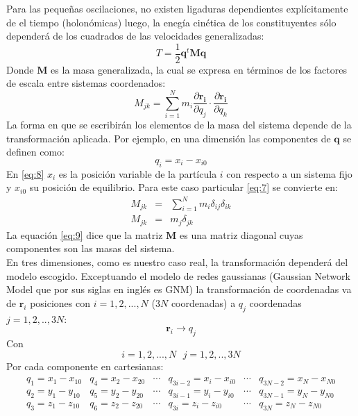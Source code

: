 Para las peque\~{n}as oscilaciones, no existen ligaduras dependientes expl\'{i}citamente de el tiempo (holon\'{o}micas) luego, la eneg\'{i}a cin\'{e}tica de los constituyentes s\'{o}lo depender\'{a} de los cuadrados de las velocidades generalizadas:
\begin{equation}
T=\frac{1}{2}\mathbf{q}^t\mathbf{M}\mathbf{q}
\end{equation}\label{eq:6}
Donde $\mathbf{M}$ es la masa generalizada, la cual se expresa en t\'{e}rminos de los factores de escala entre sistemas coordenados:
\begin{equation}
M_{jk}=\sum_{i=1}^{N} m_{i}\frac{\partial \mathbf{r_{i}} }{\partial q_j}\cdot\frac{\partial \mathbf{r_{i}} }{\partial q_k}
\end{equation}\label{eq:7}
La forma en que se escribir\'{a}n los elementos de la masa del sistema depende de la transformaci\'{o}n aplicada. Por ejemplo, en una dimensi\'{o}n las componentes de $\mathbf{q}$ se definen como:
\begin{equation}
q_i=x_i-x_{i0}
\end{equation}\label{eq:8}
En \eqref{eq:8} $x_i$ es la posici\'{o}n variable de la part\'{i}cula $i$ con respecto a un sistema fijo y $x_{i0}$ su posici\'{o}n de equilibrio. Para este caso particular \eqref{eq:7} se convierte en:
\begin{eqnarray}
M_{jk}&=&\sum_{i=1}^{N} m_{i} \delta_{ij}\delta_{ik}\nonumber \\
M_{jk}&=&m_{j} \delta_{jk}
\end{eqnarray}\label{eq:9}
La equaci\'{o}n \eqref{eq:9} dice que la matriz $\mathbf{M}$ es una matriz diagonal cuyas componentes son las masas del sistema.\\
En tres dimensiones, como es nuestro caso real, la transformaci\'{o}n depender\'{a} del modelo escogido. Exceptuando el modelo de redes gaussianas (Gaussian Network Model que por sus siglas en ingl\'{e}s es GNM) la transformaci\'{o}n de coordenadas va de $\mathbf{r}_{i}$ posiciones con $i=1,2,...,N$ ($3N$ coordenadas) a $q_j$ coordenadas $j=1,2,..,3N$:
\begin{equation*}
\mathbf{r}_{i}\longrightarrow q_{j}
\end{equation*}
Con
\begin{equation*}
i=1,2,...,N\mbox{  }j=1,2,..,3N
\end{equation*}
Por cada componente en cartesianas:
\begin{eqnarray}
\begin{array}{cccccc}
q_1=x_1-x_{10}&q_4=x_2-x_{20}&\cdots &q_{3i-2}=x_i-x_{i0}&\cdots &q_{3N-2}=x_N-x_{N0} \\
q_2=y_1-y_{10}&q_5=y_2-y_{20}&\cdots &q_{3i-1}=y_i-y_{i0}&\cdots &q_{3N-1}=y_N-y_{N0}\\
q_3=z_1-z_{10}&q_6=z_2-z_{20}&\cdots &q_{3i}=z_i-z_{i0}&\cdots &q_{3N}=z_N-z_{N0}\\
\end{array}
\end{eqnarray}\label{eq:10}
